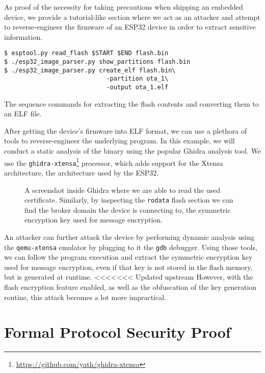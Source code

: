 \documentclass[conference]{IEEEtran}
\begin{document}
As proof of the necessity for taking precautions when shipping an embedded device, 
we provide a tutorial-like section where we act as an attacker and attempt to reverse-engineer the firmware of an ESP32
device in order to extract sensitive information.

\begin{listing}[h]
\begin{verbatim}
$ esptool.py read_flash $START $END flash.bin
$ ./esp32_image_parser.py show_partitions flash.bin
$ ./esp32_image_parser.py create_elf flash.bin\
                            -partition ota_1\
                            -output ota_1.elf
\end{verbatim}
\caption{The sequence commands for extracting the flash contents and converting them to an ELF file.}
\end{listing}

After getting the device's firmware into ELF format, we can use a plethora of tools 
to reverse-engineer the underlying program. 
In this example, we will conduct a static analysis of the binary using the popular Ghidra\cite{Ghidra, GhidraBook} analysis tool.
We use the \texttt{ghidra-xtensa}\footnote{\url{https://github.com/yath/ghidra-xtensa}} processor,
which adds support for the Xtensa architecture, the architecture used by the ESP32.

\begin{figure}[h]
    \centering
    \caption{A screenshot inside Ghidra where we are able to read the used certificate. Similarly, 
    by inspecting the \texttt{rodata} flash section we can find the broker domain the device is connecting to, the 
    symmetric encryption key used for message encryption.}
    \label{fig:ghidra}
\end{figure}

An attacker can further attack the device by performing dynamic analysis using the \texttt{qemu-xtensa} emulator
by plugging to it the \texttt{gdb} debugger. 
Using those tools, we can follow the program execution and extract the symmetric encryption key used for message encryption, 
even if that key is not stored in the flash memory, but is generated at runtime.
<<<<<<< Updated upstream
However, with the flash encryption feature enabled, as well as the obfuscation of the key generation routine,
this attack becomes a lot more impractical.

\section{Formal Protocol Security Proof}
\label{appendix:formal_protocol_security_proof}
\end{document}
